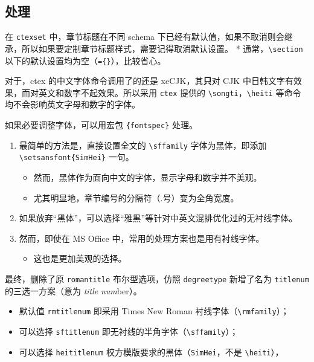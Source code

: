\documentclass[../Main/thesis.tex]{subfiles}
\begin{document}
\subsection{处理}

在 \texttt{ctexset} 中，章节标题在不同 schema
下已经有默认值，如果不取消则会继承，所以如果要定制章节标题样式，需要记得取消默认设置。
* 通常，\texttt{\textbackslash{}section}
以下的默认设置均为空（\texttt{=\{\}}），比较省心。

对于，ctex 的中文字体命令调用了的还是 xeCJK，其\textbf{只}对 CJK
中日韩文字有效果，而对英文和数字不起效果。所以采用 \texttt{ctex} 提供的
\texttt{\textbackslash{}songti}，\texttt{\textbackslash{}heiti}
等命令均不会影响英文字母和数字的字体。

如果必要调整字体，可以用宏包 \texttt{\{fontspec\}} 处理。

\begin{enumerate}
\def\labelenumi{\arabic{enumi}.}
\item
  最简单的方法是，直接设置全文的 \texttt{\textbackslash{}sffamily}
  字体为黑体，即添加 \texttt{\textbackslash{}setsansfont\{SimHei\}}
  一句。

  \begin{itemize}
  \item
    然而，黑体作为面向中文的字体，显示字母和数字并不美观。
  \item
    尤其明显地，章节编号的分隔符（.号）变为全角宽度。
  \end{itemize}
\item
  如果放弃``黑体''，可以选择``雅黑''等针对中英文混排优化过的无衬线字体。
\item
  然而，即使在 MS Office 中，常用的处理方案也是用有衬线字体。

  \begin{itemize}
  \item
    这也是更加美观的选择。
  \end{itemize}
\end{enumerate}

最终，删除了原 \texttt{romantitle} 布尔型选项，仿照 \texttt{degreetype}
新增了名为 \texttt{titlenum} 的三选一方案（意为 \emph{title}
\emph{num}ber）。

\begin{itemize}
\item
  默认值 \texttt{rmtitlenum} 即采用 Times New Roman
  衬线字体（\texttt{\textbackslash{}rmfamily}）；
\item
  可以选择 \texttt{sftitlenum}
  即无衬线的半角字体（\texttt{\textbackslash{}sffamily}）；
\item
  可以选择 \texttt{heititlenum}
  校方模版要求的黑体（\texttt{SimHei}，不是
  \texttt{\textbackslash{}heiti}），
\end{itemize}
\end{document}
